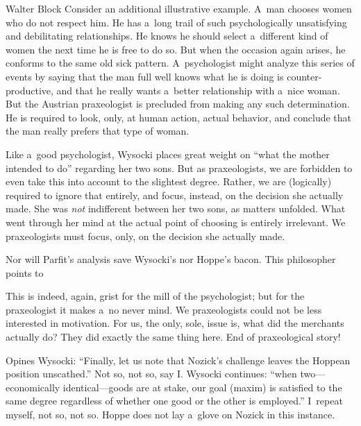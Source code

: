 \begin{artengenv}{Walter Block}
Consider an additional illustrative example. A~man chooses women who do not respect him. He has a~long trail of such psychologically unsatisfying and debilitating relationships. He knows he should select a~different kind of women the next time he is free to do so. But when the occasion again arises, he conforms to the same old sick pattern. A~psychologist might analyze this series of events by saying that the man full well knows what he is doing is counter-productive, and that he really wants a~better relationship with a~nice woman. But the Austrian praxeologist is precluded from making any such determination. He is required to look, only, at human action, actual behavior, and conclude that the man really prefers that type of woman.

Like a~good psychologist, Wysocki places great weight on ``what the mother intended to do'' regarding her two sons. But as praxeologists, we are forbidden to even take this into account to the slightest degree. Rather, we are (logically) required to ignore that entirely, and focus, instead, on the decision she actually made. She was \textit{not} indifferent between her two sons, as matters unfolded. What went through her mind at the actual point of choosing is entirely irrelevant. We praxeologists must focus, only, on the decision she actually made.

Nor will Parfit's
\parencite*[][p.289]{parfit_what_2011} %
 analysis save Wysocki's nor Hoppe's bacon. This philosopher points to

This 
is indeed, again, grist for the mill of the psychologist; but for the praxeologist it makes a~no never mind. We praxeologists could not be less interested in motivation. For us, the only, sole, issue is, what did the merchants actually do? They did exactly the same thing here. End of praxeological story!

Opines Wysocki: ``Finally, let us note that Nozick's challenge leaves the Hoppean position unscathed.'' Not so, not so, say I. Wysocki continues: ``when two---economically identical---goods are at stake, our goal (maxim) is satisfied to the same degree regardless of whether one good or the other is employed.'' I~repeat myself, not so, not so. Hoppe does not lay a~glove on Nozick in this instance.


\end{artengenv}
